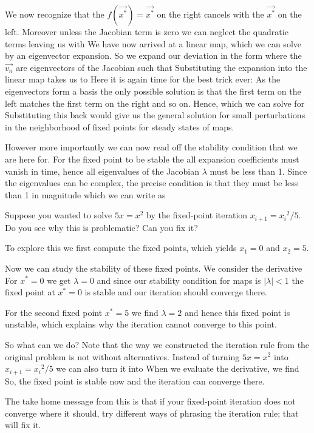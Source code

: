 We now recognize that the $f(\vec{x^*})=\vec{x^*}$ on the right cancels with the $\vec{x^*}$ on the left. Moreover unless the Jacobian term is zero we can neglect the quadratic terms leaving us with  
We have now arrived at a linear map, which we can solve by an eigenvector expansion. So we expand our deviation in the form 
where the $\vec{v_n}$ are eigenvectors of the Jacobian such that 
Substituting the expansion into the linear map takes us to 
Here it is again time for the best trick ever: As the eigenvectors form a basis the only possible solution is that the first term on the left matches the first term on the right and so on. Hence,
which we can solve for 
Substituting this back would give us the general solution for small perturbations in the neighborhood of fixed points for steady states of maps. 

However more importantly we can now read off the stability condition that we are here for. For the fixed point to be stable the all expansion coefficients must vanish in time, hence all eigenvalues of the Jacobian $\lambda$ must be less than 1. Since the eigenvalues can be complex, the precise condition is that they must be less than 1 in magnitude which we can write as 

\subquestion 
Suppose you wanted to solve $5x=x^2$ by the fixed-point iteration $x_{i+1}={x_i}^2/5$. Do you see why this is problematic? Can you fix it?

\solution 
To explore this we first compute the fixed points, which yields $x_1=0$ and $x_2=5$.

Now we can study the stability of these fixed points. We consider the derivative
For $x^*=0$ we get $\lambda=0$ and since our stability condition for maps is $|\lambda|<1$ the fixed point at $x^*=0$ is stable and our iteration should converge there. 

For the second fixed point $x^*=5$ we find $\lambda=2$ and hence this fixed point is unstable, which explains why the iteration cannot converge to this point. 

So what can we do? Note that the way we constructed the iteration rule from the original problem is not without alternatives. Instead of turning $5x=x^2$ into $x_{i+1}={x_i}^2/5$ we can also turn it into 
When we evaluate the derivative, we find 
So, the fixed point is stable now and the iteration can converge there. 

The take home message from this is that if your fixed-point iteration does not converge where it should, try different ways of phrasing the iteration rule; that will fix it. 
